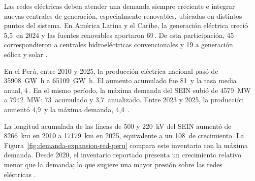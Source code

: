 \documentclass[11pt,a4paper,oneside]{report}
\newcommand{\pct}{\mbox{\char37}}
\begin{document}
Las redes eléctricas deben atender una demanda siempre creciente e integrar nuevas centrales de generación, especialmente renovables, ubicadas en distintos puntos del sistema. En América Latina y el Caribe, la generación eléctrica creció 5,5\,\pct{} en 2024 y las fuentes renovables aportaron 69\,\pct{}. De esta participación, 45\,\pct{} correspondieron a centrales hidroeléctricas convencionales y 19 a generación eólica y solar \parencite{olade2025generacionALC2024}.

En el Perú, entre 2010 y 2025, la producción eléctrica nacional pasó de \SI{35908}{\giga\watt\hour} a \SI{65109}{\giga\watt\hour}. El aumento acumulado fue 81\,\pct{} y la tasa media anual, 4\,\pct{}. En el mismo período, la máxima demanda del SEIN subió de \SI{4579}{\mega\watt} a \SI{7942}{\mega\watt}: 73\,\pct{} acumulado y 3,7\,\pct{} anualizado. Entre 2023 y 2025, la producción aumentó 4,9\,\pct{} y la máxima demanda, 4,4\,\pct{} \parencites[sec.~10.4]{minem2025anuario2024}[cuadro~4]{minem2025indicadoresDiciembre}{coesMaximaDemanda}.

La longitud acumulada de las líneas de 500 y \SI{220}{\kilo\volt} del SEIN aumentó de \SI{8266}{\kilo\metre} en 2010 a \SI{17179}{\kilo\metre} en 2025, equivalente a un 108\,\pct{} de crecimiento. La Figura~\ref{fig:demanda-expansion-red-peru} compara este inventario con la máxima demanda. Desde 2020, el inventario reportado presenta un crecimiento relativo menor que la demanda; lo que sugiere una mayor presión sobre las redes eléctricas \parencites{coesEstadisticasAnuales}{coesMaximaDemanda}.
\end{document}
